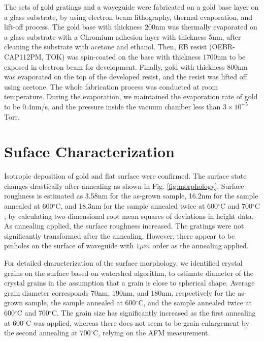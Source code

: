 \documentclass[twocolumn,11pt,a4]{article}
\begin{document}
The sets of gold gratings and a waveguide were fabricated on a gold base layer on a glass substrate, by using electron beam lithography, thermal evaporation, and lift-off process. The gold base with thickness 200nm was thermally evaporated on a glass substrate with a Chromium adhesion layer with thickness 5nm, after cleaning the substrate with acetone and ethanol. Then, EB resist (OEBR-CAP112PM, TOK) was spin-coated on the base with thickness 1700nm to be exposed in electron beam for development. Finally, gold with thickness 800nm was evaporated on the top of the developed resist, and the resist was lifted off using acetone. The whole fabrication process was conducted at room temperature. During the evaporation, we maintained the evaporation rate of gold to be 0.4nm/s, and the pressure inside the vacuum chamber less than $3\times10^{-5}$Torr. 

\section{Suface Characterization}
\label{sec:surface_characterization}
Isotropic deposition of gold and flat surface were confirmed. The surface state changes drastically after annealing as shown in Fig. \ref{fig:morphology}. Surface roughness is estimated as 3.58nm for the as-grown sample, 16.2nm for the sample annealed at 600$^\circ\mathrm{C}$, and 18.3nm for the sample annealed twice at 600$^\circ\mathrm{C}$ and 700$^\circ\mathrm{C}$, by calculating two-dimensional root mean squares of deviations in height data.  As annealing applied, the surface roughness increased.
The gratings were not significantly transformed after the annealing. However, there appear to be pinholes on the surface of waveguide with $1\mu m$ order as the annealing applied.

For detailed characterization of the surface morphology, we identified crystal grains on the surface based on watershed algorithm\cite{Petr}, to estimate diameter of the crystal grains in the assumption that a grain is close to spherical shape. Average grain diameter corresponds 70nm, 190nm, and 180nm, respectively for the as-grown sample, the sample annealed at 600$^\circ\mathrm{C}$, and the sample annealed twice at 600$^\circ\mathrm{C}$ and 700$^\circ\mathrm{C}$.
The grain size has significantly increased as the first annealing at 600$^\circ\mathrm{C}$ was applied, whereas there does not seem to be grain enlargement by the second annealing at 700$^\circ\mathrm{C}$, relying on the AFM measurement.
\end{document}
